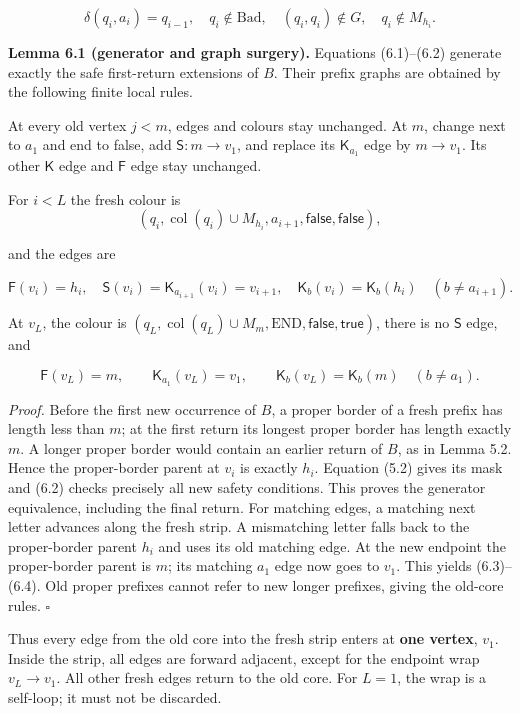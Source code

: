 \documentclass[
  11pt,
  a4paper,
]{article}
\begin{document}
\[\delta(q_i,a_i)=q_{i-1},\quad q_i\notin\mathrm{Bad},\quad
(q_i,q_i)\notin G,\quad q_i\notin M_{h_i}.\tag{6.2}\]


\textbf{Lemma 6.1 (generator and graph surgery).} Equations (6.1)--(6.2)
generate exactly the safe first-return extensions of \(B\). Their prefix
graphs are obtained by the following finite local rules.

At every old vertex \(j<m\), edges and colours stay unchanged. At \(m\),
change next to \(a_1\) and end to false, add \(\mathsf S:m\to v_1\), and
replace its \(\mathsf K_{a_1}\) edge by \(m\to v_1\). Its other
\(\mathsf K\) edge and \(\mathsf F\) edge stay unchanged.

For \(i<L\) the fresh colour is
\[(q_i,\operatorname{col}(q_i)\cup M_{h_i},a_{i+1},\mathsf{false},\mathsf{false}),\]

and the edges are

\[\mathsf F(v_i)=h_i,\quad
\mathsf S(v_i)=\mathsf K_{a_{i+1}}(v_i)=v_{i+1},\quad
\mathsf K_b(v_i)=\mathsf K_b(h_i)\quad(b\ne a_{i+1}).\tag{6.3}\]

At \(v_L\), the colour is
\((q_L,\operatorname{col}(q_L)\cup M_m,\mathrm{END},\mathsf{false},\mathsf{true})\),
there is no \(\mathsf S\) edge, and

\[\mathsf F(v_L)=m,\qquad \mathsf K_{a_1}(v_L)=v_1,\qquad
\mathsf K_b(v_L)=\mathsf K_b(m)\quad(b\ne a_1).\tag{6.4}\]

\emph{Proof.} Before the first new occurrence of \(B\), a proper border
of a fresh prefix has length less than \(m\); at the first return its
longest proper border has length exactly \(m\). A longer proper border
would contain an earlier return of \(B\), as in Lemma 5.2. Hence the
proper-border parent at \(v_i\) is exactly \(h_i\). Equation (5.2) gives
its mask and (6.2) checks precisely all new safety conditions. This
proves the generator equivalence, including the final return. For
matching edges, a matching next letter advances along the fresh strip. A
mismatching letter falls back to the proper-border parent \(h_i\) and
uses its old matching edge. At the new endpoint the proper-border parent
is \(m\); its matching \(a_1\) edge now goes to \(v_1\). This yields
(6.3)--(6.4). Old proper prefixes cannot refer to new longer prefixes,
giving the old-core rules. \(\square\)

Thus every edge from the old core into the fresh strip enters at
\textbf{one vertex}, \(v_1\). Inside the strip, all edges are forward
adjacent, except for the endpoint wrap \(v_L\to v_1\). All other fresh
edges return to the old core. For \(L=1\), the wrap is a self-loop; it
must not be discarded.
\end{document}
